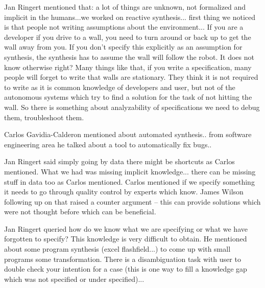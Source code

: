 \documentclass[sigconf]{acmart}
\begin{document}
Jan Ringert mentioned that:  a lot of things are unknown, not formalized and implicit in the humans...we worked on reactive synthesis... first thing we noticed is that people not writing assumptions about the environment... If you are a developer if you drive to a wall, you need to turn around or back up to get the wall away from you. If you don't specify this explicitly as an assumption for synthesis, the synthesis has to assume the wall will follow the robot. It does not know otherwise right? Many things like that, if you write a specification, many people will forget to write that walls are stationary. They think it is not required to write as it is common knowledge of developers and user, but not of the autonomous systems which try to find a solution for the task of not hitting the wall. So there is something about analyzability of specifications we need to debug them, troubleshoot them. 

Carlos Gavidia-Calderon mentioned about automated synthesis.. from software engineering area he talked about a tool to  automatically fix bugs..

Jan Ringert said simply going by data there might be shortcuts as Carlos mentioned. What we had was missing implicit knowledge... there can be missing stuff in data too as Carlos mentioned. Carlos mentioned if we specify something it needs to go through quality control by experts which know. James Wilson following up on that raised a counter argument -- this can provide solutions which were not thought before which can be beneficial.   

Jan Ringert queried how do we know what we are specifying or what we have forgotten to specify? This knowledge is very difficult to obtain. He mentioned about some program synthesis (excel flashfield...) to come up with small programs some transformation. There is a disambiguation task with user to double check your intention for a case (this is one way to fill a knowledge gap which was not specified or under specified)...\\

\end{document}
